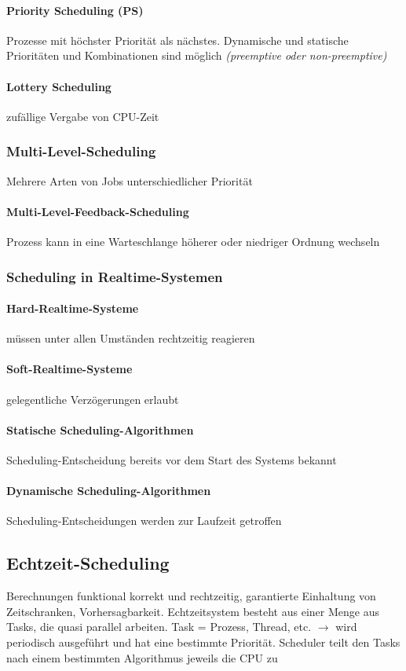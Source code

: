 \documentclass[10pt,a4paper,landscape]{article}
\begin{document}
\begin{multicols*}{3}
	\paragraph{Priority Scheduling (PS)} Prozesse mit höchster Priorität als nächstes. Dynamische und statische Prioritäten und Kombinationen sind möglich \textit{(preemptive oder non-preemptive)}
	\paragraph{Lottery Scheduling} zufällige Vergabe von CPU-Zeit
	\subsubsection{Multi-Level-Scheduling}
	Mehrere Arten von Jobs unterschiedlicher Priorität
	\paragraph{Multi-Level-Feedback-Scheduling} Prozess kann in eine Warteschlange höherer oder niedriger Ordnung wechseln
	\subsubsection{Scheduling in Realtime-Systemen}
	\paragraph{Hard-Realtime-Systeme} müssen unter allen Umständen rechtzeitig reagieren
	\paragraph{Soft-Realtime-Systeme} gelegentliche Verzögerungen erlaubt
	\paragraph{Statische Scheduling-Algorithmen} Scheduling-Entscheidung bereits vor dem Start des Systems bekannt
	\paragraph{Dynamische Scheduling-Algorithmen} Scheduling-Entscheidungen werden zur Laufzeit getroffen
	\subsection{Echtzeit-Scheduling}
	Berechnungen funktional korrekt und rechtzeitig, garantierte Einhaltung von Zeitschranken, Vorhersagbarkeit. Echtzeitsystem besteht aus einer Menge aus Tasks, die quasi parallel arbeiten. Task = Prozess, Thread, etc. $\rightarrow$ wird periodisch ausgeführt und hat eine bestimmte Priorität. Scheduler teilt den Tasks nach einem bestimmten Algorithmus jeweils die CPU zu

\end{multicols*}
\end{document}
